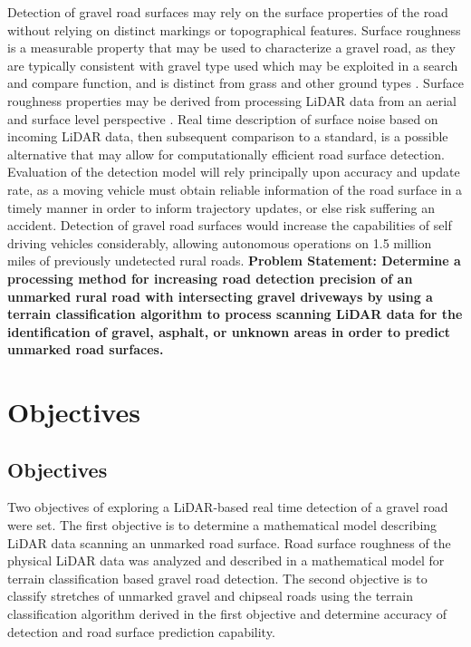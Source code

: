 \documentclass[numbered,pdftex]{ohio-etd}
\begin{document}
{	{Detection of gravel road surfaces may rely on the surface properties of the road without relying on distinct markings or topographical features. Surface roughness is a measurable property that may be used to characterize a gravel road, as they are typically consistent with gravel type used \cite{skorseth_gravel_nodate} which may be exploited in a search and compare function, and is distinct from grass and other ground types \cite{wan_road_2007, levi_3d_2012_light, levi_3d_2012_terrain}. Surface roughness properties may be derived from processing LiDAR data from an aerial and surface level perspective \cite{wan_road_2007, levi_3d_2012_light, levi_3d_2012_terrain, pollyea_experimental_2012,rychkov_computational_2012,lague_accurate_2013,brubaker_use_2013,turner_estimation_2014,campbell_lidar-based_2017,shepard_roughness_2001,tegowski_statistical_2016,sock_probabilistic_2016,milenkovic_roughness_2018,yadav_extraction_2017, yadav_rural_2018}. Real time description of surface noise based on incoming LiDAR data, then subsequent comparison to a standard, is a possible alternative that may allow for computationally efficient road surface detection. Evaluation of the detection model will rely principally upon accuracy and update rate, as a moving vehicle must obtain reliable information of the road surface in a timely manner in order to inform trajectory updates, or else risk suffering an accident. Detection of gravel road surfaces would increase the capabilities of self driving vehicles considerably, allowing autonomous operations on 1.5 million miles \cite{road_stats_2} of previously undetected rural roads. \textbf{Problem Statement: Determine a processing method for increasing road detection precision of an unmarked rural road with intersecting gravel driveways by using a terrain classification algorithm to process scanning LiDAR data for the identification of gravel, asphalt, or unknown areas in order to predict unmarked road surfaces.}}
	
}

\chapter{Objectives}

\section{Objectives}

	{Two objectives of exploring a LiDAR-based real time detection of a gravel road were set. The first objective is to determine a mathematical model describing LiDAR data scanning an unmarked road surface. Road surface roughness of the physical LiDAR data was analyzed and described in a mathematical model for terrain classification based gravel road detection. The second objective is to classify stretches of unmarked gravel and chipseal roads using the terrain classification algorithm derived in the first objective and determine accuracy of detection and road surface prediction capability.}
\end{document}

